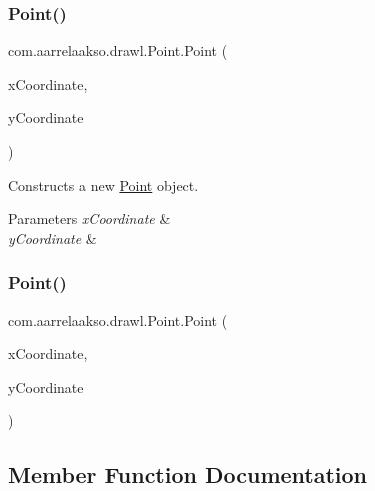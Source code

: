 \subsubsection{\texorpdfstring{Point()}{Point()}\hspace{0.1cm}{\footnotesize\ttfamily [1/2]}}
{\footnotesize\ttfamily com.\+aarrelaakso.\+drawl.\+Point.\+Point (\begin{DoxyParamCaption}\item[{final \hyperlink{interfacecom_1_1aarrelaakso_1_1drawl_1_1_number}{Number}}]{x\+Coordinate,  }\item[{final \hyperlink{interfacecom_1_1aarrelaakso_1_1drawl_1_1_number}{Number}}]{y\+Coordinate }\end{DoxyParamCaption})\hspace{0.3cm}{\ttfamily [protected]}}



Constructs a new \hyperlink{classcom_1_1aarrelaakso_1_1drawl_1_1_point}{Point} object. 


\begin{DoxyParams}{Parameters}
{\em x\+Coordinate} & \\
\hline
{\em y\+Coordinate} & \\
\hline
\end{DoxyParams}
\mbox{\label{classcom_1_1aarrelaakso_1_1drawl_1_1_point_afb3376a5897946911a2230562fff07cf}} 
\subsubsection{\texorpdfstring{Point()}{Point()}\hspace{0.1cm}{\footnotesize\ttfamily [2/2]}}
{\footnotesize\ttfamily com.\+aarrelaakso.\+drawl.\+Point.\+Point (\begin{DoxyParamCaption}\item[{@Not\+Null final Integer}]{x\+Coordinate,  }\item[{@Not\+Null final Integer}]{y\+Coordinate }\end{DoxyParamCaption})\hspace{0.3cm}{\ttfamily [protected]}}



\subsection{Member Function Documentation}
\mbox{\label{classcom_1_1aarrelaakso_1_1drawl_1_1_point_a39d39c84f2d05c9a2551cbc584c47bfc}} 
